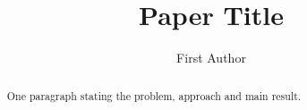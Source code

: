 \documentclass[sigconf,review,anonymous]{acmart}
\begin{document}
\title{Paper Title}
\author{First Author}
\begin{abstract}
One paragraph stating the problem, approach and main result.
\end{abstract}
\maketitle




\end{document}

